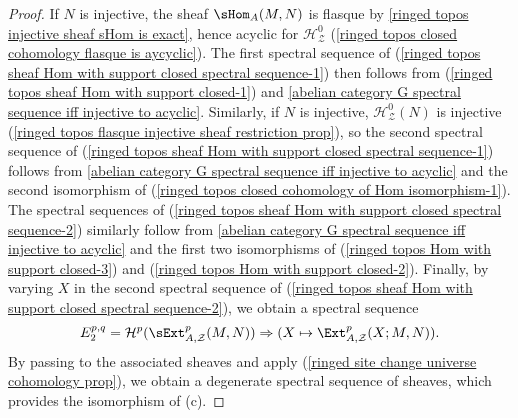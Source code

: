 \begin{proof}
If $N$ is injective, the sheaf $\sHom_A(M,N)$ is flasque by \cref{ringed topos injective sheaf sHom is exact}, hence acyclic for $\mathcal{H}^0_\mathcal{Z}$ (\cref{ringed topos closed cohomology flasque is aycyclic}). The first spectral sequence of (\ref{ringed topos sheaf Hom with support closed spectral sequence-1}) then follows from (\ref{ringed topos sheaf Hom with support closed-1}) and \cref{abelian category G spectral sequence iff injective to acyclic}. Similarly, if $N$ is injective, $\mathcal{H}_\mathcal{Z}^0(N)$ is injective (\cref{ringed topos flasque injective sheaf restriction prop}), so the second spectral sequence of (\ref{ringed topos sheaf Hom with support closed spectral sequence-1}) follows from \cref{abelian category G spectral sequence iff injective to acyclic} and the second isomorphism of (\ref{ringed topos closed cohomology of Hom isomorphism-1}). The spectral sequences of (\ref{ringed topos sheaf Hom with support closed spectral sequence-2}) similarly follow from \cref{abelian category G spectral sequence iff injective to acyclic} and the first two isomorphisms of (\ref{ringed topos Hom with support closed-3}) and (\ref{ringed topos Hom with support closed-2}). Finally, by varying $X$ in the second spectral sequence of (\ref{ringed topos sheaf Hom with support closed spectral sequence-2}), we obtain a spectral sequence
\[E_2^{p,q}=\mathcal{H}^p(\sExt_{A,\mathcal{Z}}^p(M,N))\Rightarrow (X\mapsto \Ext_{A,\mathcal{Z}}^p(X;M,N)).\]
By passing to the associated sheaves and apply (\ref{ringed site change universe cohomology prop}), we obtain a degenerate spectral sequence of sheaves, which provides the isomorphism of (c).
\end{proof}

